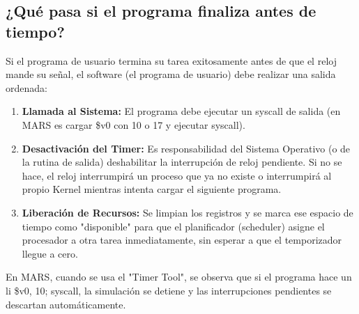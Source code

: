\documentclass[]{article}
\begin{document}
	\subsection{¿Qué pasa si el programa finaliza antes de tiempo?}
		Si el programa de usuario termina su tarea exitosamente antes de que el reloj mande su señal, el software (el programa de usuario) debe realizar una salida ordenada:
		\begin{enumerate}
			\item \textbf{Llamada al Sistema:} 
				El programa debe ejecutar un syscall de salida (en MARS es cargar \$v0 con 10 o 17 y ejecutar syscall).
			\item \textbf{Desactivación del Timer:} Es responsabilidad del Sistema Operativo (o de la rutina de salida) deshabilitar la interrupción de reloj pendiente. Si no se hace, el reloj interrumpirá un proceso que ya no existe o interrumpirá al propio Kernel mientras intenta cargar el siguiente programa.
			\item \textbf{Liberación de Recursos:} Se limpian los registros y se marca ese espacio de tiempo como "disponible" para que el planificador (scheduler) asigne el procesador a otra tarea inmediatamente, sin esperar a que el temporizador llegue a cero.
		\end{enumerate}
		En MARS, cuando se usa el "Timer Tool", se observa que si el programa hace un li \$v0, 10; syscall, la simulación se detiene y las interrupciones pendientes se descartan automáticamente.
		
\end{document}
